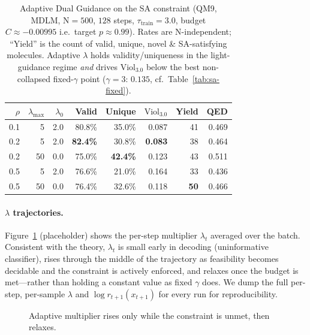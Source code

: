 \documentclass{article}
\begin{document}
\begin{table}[t]
\centering
\caption{Adaptive Dual Guidance on the SA constraint (QM9, MDLM, N$=500$, $128$ steps, $\tau_{\text{train}}{=}3.0$, budget $C{\approx}{-}0.00995$ i.e.\ target $p\approx0.99$). Rates are N-independent; ``Yield'' is the count of valid, unique, novel \& SA-satisfying molecules. Adaptive $\lambda$ holds validity/uniqueness in the light-guidance regime \emph{and} drives $\mathrm{Viol}_{3.0}$ below the best non-collapsed fixed-$\gamma$ point ($\gamma{=}3$: $0.135$, cf.\ Table~\ref{tab:sa-fixed}).}
\label{tab:adaptive-sa}
\begin{tabular}{rrrrrrrr}
\toprule
$\rho$ & $\lambda_{\max}$ & $\lambda_0$ & Valid & Unique & $\mathrm{Viol}_{3.0}$ & Yield & QED \\
\midrule
0.1 & 5  & 2.0 & 80.8\% & 35.0\% & 0.087 & 41 & 0.469 \\
0.2 & 5  & 2.0 & \textbf{82.4\%} & 30.8\% & \textbf{0.083} & 38 & 0.464 \\
0.2 & 50 & 0.0 & 75.0\% & \textbf{42.4\%} & 0.123 & 43 & 0.511 \\
0.5 & 5  & 2.0 & 76.6\% & 21.0\% & 0.164 & 33 & 0.436 \\
0.5 & 50 & 0.0 & 76.4\% & 32.6\% & 0.118 & \textbf{50} & 0.466 \\
\bottomrule
\end{tabular}
\end{table}

\paragraph{$\lambda$ trajectories.} Figure~\ref{fig:traj} (placeholder) shows the per-step multiplier $\lambda_t$ averaged over the batch. Consistent with the theory, $\lambda_t$ is small early in decoding (uninformative classifier), rises through the middle of the trajectory as feasibility becomes decidable and the constraint is actively enforced, and relaxes once the budget is met---rather than holding a constant value as fixed $\gamma$ does. We dump the full per-step, per-sample $\lambda$ and $\log r_{t+1}(x_{t+1})$ for every run for reproducibility.

\begin{figure}[t]
\centering
{}
\caption{Adaptive multiplier rises only while the constraint is unmet, then relaxes.}
\label{fig:traj}
\end{figure}
\end{document}

